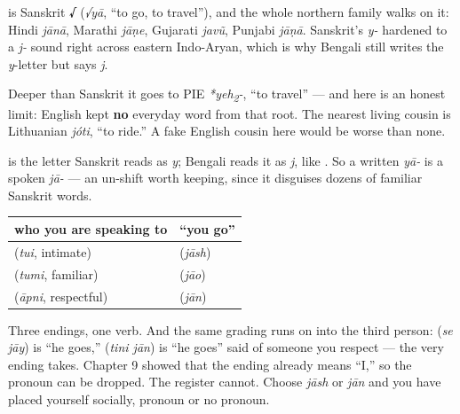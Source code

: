 \begin{cousinweb}
\textbf{} is Sanskrit \textbf{√} (\emph{√yā}, \textquotedblleft{}to go, to travel\textquotedblright{}), and the whole northern family walks on it: Hindi \emph{jānā}, Marathi \emph{jāṇe}, Gujarati \emph{javũ}, Punjabi \emph{jāṇā}. Sanskrit's \emph{y-} hardened to a \emph{j-} sound right across eastern Indo-Aryan, which is why Bengali still writes the \emph{y}-letter \textbf{} but says \emph{j}.

Deeper than Sanskrit it goes to PIE \emph{*yeh\textsubscript{2}-}, \textquotedblleft{}to travel\textquotedblright{} — and here is an honest limit: English kept \textbf{no} everyday word from that root. The nearest living cousin is Lithuanian \emph{jóti}, \textquotedblleft{}to ride.\textquotedblright{} A fake English cousin here would be worse than none.
\end{cousinweb}

\begin{sounds}
\textbf{} is the letter Sanskrit reads as \emph{y}; Bengali reads it as \emph{j}, like \textbf{}. So a written \emph{yā-} is a spoken \emph{jā-} — an un-shift worth keeping, since it disguises dozens of familiar Sanskrit words.
\end{sounds}

\begin{grammarlens}[title={Grammar Lens: the respect is not in the pronoun, it is in the ending}]
\noindent
\begin{tabularx}{\linewidth}{@{}>{\raggedright\arraybackslash}X>{\raggedright\arraybackslash}X@{}}
\toprule
\textbf{who you are speaking to} & \textbf{\textquotedblleft{}you go\textquotedblright{}} \\
\midrule
\bn{তুই} (\emph{tui}, intimate) & \bn{যাস} (\emph{jāsh}) \\
\bn{তুমি} (\emph{tumi}, familiar) & \bn{যাও} (\emph{jāo}) \\
\bn{আপনি} (\emph{āpni}, respectful) & \bn{যান} (\emph{jān}) \\
\bottomrule
\end{tabularx}

Three endings, one verb. And the same grading runs on into the third person:   (\emph{se jāy}) is \textquotedblleft{}he goes,\textquotedblright{}   (\emph{tini jān}) is \textquotedblleft{}he goes\textquotedblright{} said of someone you respect — the very ending  takes. Chapter 9 showed that the ending already means \textquotedblleft{}I,\textquotedblright{} so the pronoun can be dropped. The register cannot. Choose \emph{jāsh} or \emph{jān} and you have placed yourself socially, pronoun or no pronoun.
\end{grammarlens}

